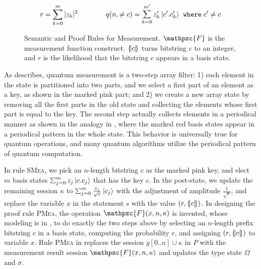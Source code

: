 \begin{figure}[t]
{{\begin{minipage}[t]{\textwidth}
\begin{mathpar}
  \end{mathpar}

  \label{fig:qafny-mea-rules}
\end{minipage}
}
}
{\footnotesize
\[r= \sum_{k=0}^{m} \slen{z_k}^2
\qquad\qquad
q(n,\neq c) = \schk{m'}{z'_k}{c'.c'_{k}} \;\;\texttt{where}\;c'\neq c\]
}
\caption{Semantic and Proof Rules for Measurement. $\mathpzc{F}$ is the measurement function construct. $\tov{c}$ turns bitstring $c$ to an integer, and $r$ is the likelihood that the bitstring $c$ appears in a basis state. }
\label{fig:exp-proofsystem-4}
\end{figure}

\label{sec:measurement}
As  describes, quantum measurement is a two-step array filter: 1) each element in the state is partitioned into two parts, and we select a first part of an element as a key, as shown in the marked pink part; and 2) we create a new array state by removing all the first parts in the old state and collecting the elements whose first part is equal to the key.
The second step actually collects elements in a periodical manner as shown in the analogy in , where the marked red basis states appear in a periodical pattern in the whole state. This behavior is universally true for quantum operations, and many quantum algorithms utilize the periodical pattern of quantum computation.

In rule \textsc{SMea}, we pick an $n$-length bitstring $c$ as the marked pink key, and elect $m$ basis states $\sch{m}{z_j}{c.c_{j}}$ that has the key $c$. In the post-state, we update the remaining session $\kappa$ to $\sch{m}{\frac{z_j}{\sqrt{r}}}{c_{j}}$ with the adjustment of amplitude $\frac{1}{\sqrt{r}}$, and replace the variable $x$ in the statement $s$ with the value $(r,\tov{c})$.
In designing the proof rule \textsc{PMea}, the operation $\mathpzc{F}(x,n,\kappa)$ is invented,
whose modeling is in , to do exactly the two steps above by selecting an $n$-length prefix bitstring $c$ in a basis state, computing the probability $r$, and assigning $(r,\tov{c})$ to variable $x$.
Rule \textsc{PMea} in  replaces the session $y[0..n]\cup \kappa$ in $P$ with the measurement result session $\mathpzc{F}(x,n,\kappa)$ and updates the type state $\Omega$ and $\sigma$. 

